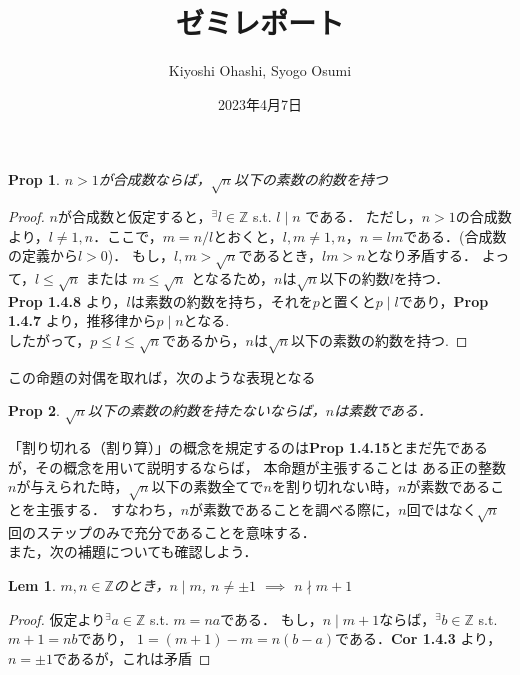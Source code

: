 \documentclass{jsarticle}
\title{ゼミレポート}
\author{Kiyoshi Ohashi, Syogo Osumi}
\date{2023年4月7日}
\newtheorem{prop}{Prop}
\newtheorem{lem}{Lem}
\begin{document}
  \maketitle

    \begin{prop}
      $n>1$が合成数ならば，$\sqrt{n}$以下の素数の約数を持つ
    \end{prop}

    \begin{proof}
      $n$が合成数と仮定すると，$^{\exists}l \in \mathbb{Z}$ s.t. $l \mid n$ である．
      ただし，$n>1$の合成数より，$ l \neq 1, n$．ここで，$m=n/l$とおくと，$l,m \neq 1,n$，$n = lm$である．(合成数の定義から$l>0$)．
      もし，$l,m > \sqrt{n}$であるとき，$lm > n$となり矛盾する．
      よって，$l \leq \sqrt{n}$ または $m \leq \sqrt{n}$ となるため，$n$は$\sqrt{n}$以下の約数$l$を持つ． \\
      \textbf{Prop 1.4.8} より，$l$は素数の約数を持ち，それを$p$と置くと$ p \mid l$であり，\textbf{Prop 1.4.7} より，推移律から$p \mid n$となる. \\
      したがって，$p \leq l \leq \sqrt{n}$であるから，$n$は$\sqrt{n}$以下の素数の約数を持つ.
    \end{proof}

    この命題の対偶を取れば，次のような表現となる

    \begin{prop}
      $\sqrt{n}$以下の素数の約数を持たないならば，$n$は素数である．
    \end{prop}

    「割り切れる（割り算）」の概念を規定するのは\textbf{Prop 1.4.15}とまだ先であるが，その概念を用いて説明するならば，
    本命題が主張することは ある正の整数$n$が与えられた時，$\sqrt{n}$以下の素数全てで$n$を割り切れない時，$n$が素数であることを主張する．
    すなわち，$n$が素数であることを調べる際に，$n$回ではなく$\sqrt{n}$回のステップのみで充分であることを意味する． \\

    また，次の補題についても確認しよう．

    \begin{lem}
      $m, n \in \mathbb{Z}$のとき，$n \mid m$, $n \neq \pm 1$ $\implies$ $n \nmid m + 1$
    \end{lem}

    \begin{proof}
      仮定より$^{\exists}a \in \mathbb{Z}$ s.t. $m = na$である．
      もし，$n \mid m+1$ならば，$^{\exists}b \in \mathbb{Z}$ s.t. $m+1 = nb$であり，
      $1 = (m+1)-m = n(b-a)$である．\textbf{Cor 1.4.3} より，$n = \pm 1$であるが，これは矛盾
    \end{proof}
\end{document}
